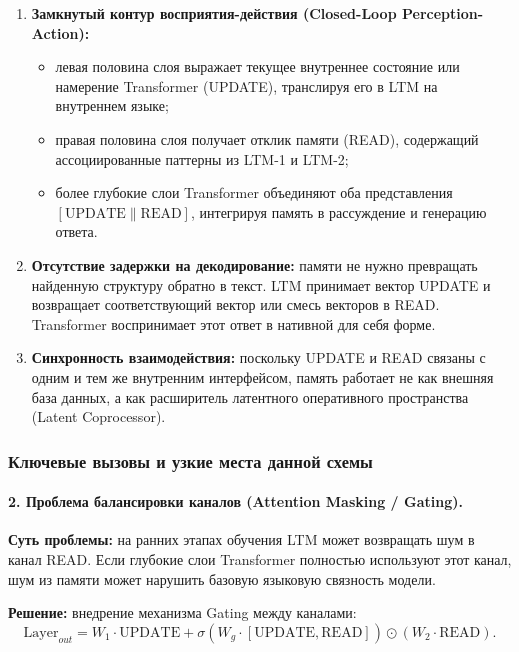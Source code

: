 \documentclass[11pt,a4paper]{article}
\begin{document}
\begin{enumerate}
    \item \textbf{Замкнутый контур восприятия-действия (Closed-Loop Perception-Action):}
    \begin{itemize}
        \item левая половина слоя выражает текущее внутреннее состояние или намерение Transformer (UPDATE), транслируя его в LTM на внутреннем языке;
        \item правая половина слоя получает отклик памяти (READ), содержащий ассоциированные паттерны из LTM-1 и LTM-2;
        \item более глубокие слои Transformer объединяют оба представления $[\mathrm{UPDATE} \parallel \mathrm{READ}]$, интегрируя память в рассуждение и генерацию ответа.
    \end{itemize}
    \item \textbf{Отсутствие задержки на декодирование:} памяти не нужно превращать найденную структуру обратно в текст. LTM принимает вектор UPDATE и возвращает соответствующий вектор или смесь векторов в READ. Transformer воспринимает этот ответ в нативной для себя форме.
    \item \textbf{Синхронность взаимодействия:} поскольку UPDATE и READ связаны с одним и тем же внутренним интерфейсом, память работает не как внешняя база данных, а как расширитель латентного оперативного пространства (Latent Coprocessor).
\end{enumerate}

\subsubsection*{Ключевые вызовы и узкие места данной схемы}

\paragraph{2. Проблема балансировки каналов (Attention Masking / Gating).}
\textbf{Суть проблемы:} на ранних этапах обучения LTM может возвращать шум в канал READ. Если глубокие слои Transformer полностью используют этот канал, шум из памяти может нарушить базовую языковую связность модели.

\textbf{Решение:} внедрение механизма Gating между каналами:
\begin{equation}
\mathrm{Layer}_{out}
=
W_1 \cdot \mathrm{UPDATE}
+
\sigma\!\left(W_g \cdot [\mathrm{UPDATE},\mathrm{READ}]\right)
\odot
\left(W_2 \cdot \mathrm{READ}\right).
\end{equation}
\end{document}
